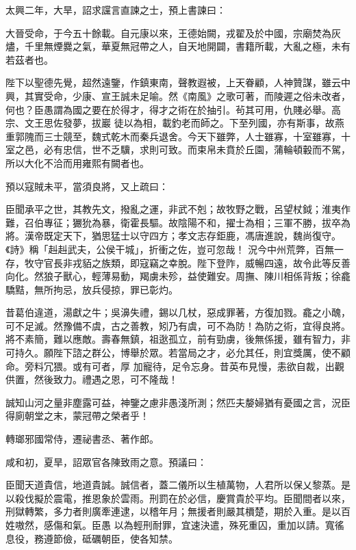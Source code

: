 \begin{pinyinscope}
 太興二年，大旱，詔求讜言直諫之士，預上書諫曰：



 大晉受命，于今五十餘載。自元康以來，王德始闕，戎翟及於中國，宗廟焚為灰燼，千里無煙爨之氣，華夏無冠帶之人，自天地開闢，書籍所載，大亂之極，未有若茲者也。



 陛下以聖德先覺，超然遠鑒，作鎮東南，聲教遐被，上天眷顧，人神贊謀，雖云中興，其實受命，少康、宣王誠未足喻。然《南風》之歌可著，而陵遲之俗未改者，何也？臣愚謂為國之要在於得才，得才之術在於抽引。茍其可用，仇賤必舉。高宗、文王思佐發夢，拔巖
 徒以為相，載釣老而師之。下至列國，亦有斯事，故燕重郭隗而三士競至，魏式乾木而秦兵退舍。今天下雖弊，人士雖寡，十室雖寡，十室之邑，必有忠信，世不乏驥，求則可致。而束帛未賁於丘園，蒲輪頓轂而不駕，所以大化不洽而用雍熙有闕者也。



 預以寇賊未平，當須良將，又上疏曰：



 臣聞承平之世，其教先文，撥亂之運，非武不剋；故牧野之戰，呂望杖鉞；淮夷作難，召伯專征；玁狁為暴，衛霍長驅。故陰陽不和，擢士為相；三軍不勝，拔卒為將。漢帝既定天下，猶思猛士以守四方；孝文志存鉅鹿，馮唐進說，魏尚復守。《詩》稱「赳赳武夫，公侯干城」，折衝之佐，豈可忽哉！
 況今中州荒弊，百無一存，牧守官長非戎貊之族類，即寇竊之幸脫。陛下登阼，威暢四遠，故令此等反善向化。然狼子獸心，輕薄易動，羯虜未殄，益使難安。周撫、陳川相係背叛；徐龕驕黠，無所拘忌，放兵侵掠，罪已彰灼。



 昔葛伯違道，湯獻之牛；吳濞失禮，錫以几杖，惡成罪著，方復加戮。龕之小醜，可不足滅。然豫備不虞，古之善教，矧乃有虞，可不為防！為防之術，宜得良將。將不素簡，難以應敵。壽春無鎮，祖逖孤立，前有勁虜，後無係援，雖有智力，非可持久。願陛下諮之群公，博舉於眾。若當局之才，必允其任，則宜獎厲，使不顧命。旁料冗猥。或有可者，厚
 加寵待，足令忘身。昔英布見慢，恚欲自裁，出觀供置，然後致力。禮遇之恩，可不隆哉！



 誠知山河之量非塵露可益，神鑒之慮非愚淺所測；然匹夫嫠婦猶有憂國之言，況臣得廁朝堂之末，蒙冠帶之榮者乎！



 轉瑯邪國常侍，遷祕書丞、著作郎。



 咸和初，夏旱，詔眾官各陳致雨之意。預議曰：



 臣聞天道貴信，地道貴誠。誠信者，蓋二儀所以生植萬物，人君所以保乂黎蒸。是以殺伐擬於震電，推恩象於雲雨。刑罰在於必信，慶賞貴於平均。臣聞間者以來，刑獄轉繁，多力者則廣牽連逮，以稽年月；無援者則嚴其檟楚，期於入重。是以百姓嗷然，感傷和氣。臣愚
 以為輕刑耐罪，宜速決遣，殊死重囚，重加以請。寬徭息役，務遵節儉，砥礪朝臣，使各知禁。




\end{pinyinscope}
